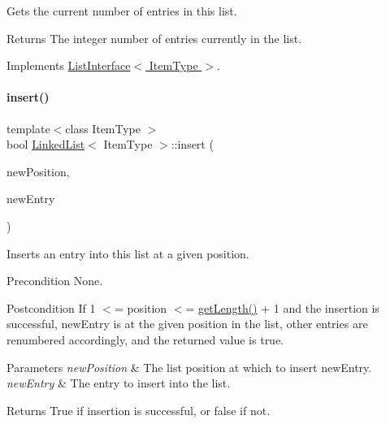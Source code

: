 Gets the current number of entries in this list. \begin{DoxyReturn}{Returns}
The integer number of entries currently in the list. 
\end{DoxyReturn}


Implements \hyperlink{class_list_interface_afc85695d4137f1e29ff02e179c9f3221}{List\+Interface$<$ Item\+Type $>$}.

\hypertarget{class_linked_list_ae8a19375505e87e2e4fc0e9b5afe4d4d}{}\label{class_linked_list_ae8a19375505e87e2e4fc0e9b5afe4d4d} 
\paragraph{\texorpdfstring{insert()}{insert()}}
{\footnotesize\ttfamily template$<$class Item\+Type $>$ \\
bool \hyperlink{class_linked_list}{Linked\+List}$<$ Item\+Type $>$\+::insert (\begin{DoxyParamCaption}\item[{int}]{new\+Position,  }\item[{const Item\+Type \&}]{new\+Entry }\end{DoxyParamCaption})\hspace{0.3cm}{\ttfamily [virtual]}}

Inserts an entry into this list at a given position. \begin{DoxyPrecond}{Precondition}
None. 
\end{DoxyPrecond}
\begin{DoxyPostcond}{Postcondition}
If 1 $<$= position $<$= \hyperlink{class_linked_list_a61d045ef6008b494a1a516ecc992c0e7}{get\+Length()} + 1 and the insertion is successful, new\+Entry is at the given position in the list, other entries are renumbered accordingly, and the returned value is true. 
\end{DoxyPostcond}

\begin{DoxyParams}{Parameters}
{\em new\+Position} & The list position at which to insert new\+Entry. \\
\hline
{\em new\+Entry} & The entry to insert into the list. \\
\hline
\end{DoxyParams}
\begin{DoxyReturn}{Returns}
True if insertion is successful, or false if not. 
\end{DoxyReturn}


